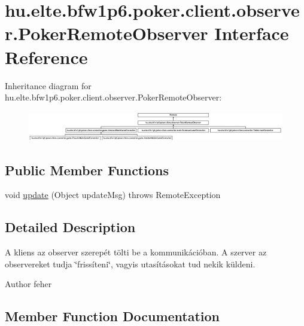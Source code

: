 \hypertarget{interfacehu_1_1elte_1_1bfw1p6_1_1poker_1_1client_1_1observer_1_1_poker_remote_observer}{}\section{hu.\+elte.\+bfw1p6.\+poker.\+client.\+observer.\+Poker\+Remote\+Observer Interface Reference}
\label{interfacehu_1_1elte_1_1bfw1p6_1_1poker_1_1client_1_1observer_1_1_poker_remote_observer}
Inheritance diagram for hu.\+elte.\+bfw1p6.\+poker.\+client.\+observer.\+Poker\+Remote\+Observer\+:\begin{figure}[H]
\begin{center}
\leavevmode
\includegraphics[height=1.296296cm]{interfacehu_1_1elte_1_1bfw1p6_1_1poker_1_1client_1_1observer_1_1_poker_remote_observer}
\end{center}
\end{figure}
\subsection*{Public Member Functions}
\begin{DoxyCompactItemize}
\item 
void \hyperlink{interfacehu_1_1elte_1_1bfw1p6_1_1poker_1_1client_1_1observer_1_1_poker_remote_observer_a3b701b6771f57bd6fb8afb247d08c47d}{update} (Object update\+Msg)  throws Remote\+Exception
\end{DoxyCompactItemize}


\subsection{Detailed Description}
A kliens az observer szerepét tölti be a kommunikációban. A szerver az observereket tudja \char`\"{}frissíteni\char`\"{}, vagyis utasításokat tud nekik küldeni. \begin{DoxyAuthor}{Author}
feher 
\end{DoxyAuthor}


\subsection{Member Function Documentation}
\hypertarget{interfacehu_1_1elte_1_1bfw1p6_1_1poker_1_1client_1_1observer_1_1_poker_remote_observer_a3b701b6771f57bd6fb8afb247d08c47d}{}
